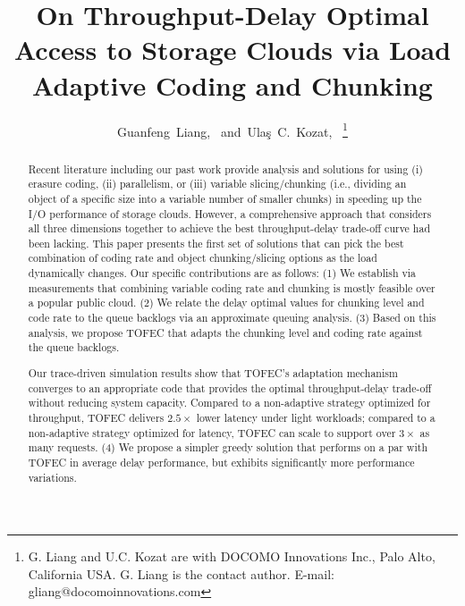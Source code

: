 \documentclass[journal]{IEEEtran}
\newcommand{\comment}[1]{}
\newcommand{\ourscheme}{TOFEC\xspace}
\begin{document}
\title{On Throughput-Delay Optimal Access to Storage Clouds via Load Adaptive Coding and Chunking}

\author{Guanfeng~Liang,~
        and~Ula\c{s}~C.~Kozat,~
\thanks{G. Liang and U.C. Kozat are with DOCOMO Innovations Inc., Palo Alto, California USA. G. Liang is the contact author. E-mail: gliang@docomoinnovations.com}
}
\maketitle

\begin{abstract}
Recent literature including our past work provide analysis and solutions for using (i) erasure coding, (ii) parallelism, or (iii) variable slicing/chunking (i.e., dividing an object of a specific size into a variable number of smaller chunks) in speeding up the I/O performance of storage clouds.  However, a comprehensive approach that considers all three dimensions together to achieve the best throughput-delay trade-off curve had been lacking.  This paper presents the first set of solutions that can pick the best combination of coding rate and object chunking/slicing options as the load dynamically changes. Our specific contributions are as follows: (1) We establish via measurements that combining variable coding rate and chunking is mostly feasible over a popular public cloud. (2) We relate the delay optimal values for chunking level and code rate to the queue backlogs via an approximate queuing analysis. (3) Based on this analysis, we propose \ourscheme that adapts the chunking level and coding rate against the queue backlogs. 
\comment{Under light workloads, \ourscheme creates  smaller chunks and uses more parallel connections per file, minimizing service delay. Under heavy workloads, \ourscheme automatically reduces the level of chunking (fewer chunks with increased size) and uses fewer parallel connections to reduce overhead, resulting in higher throughput and preventing queueing delay.} 
Our trace-driven simulation results show that \ourscheme's adaptation mechanism converges to an appropriate code that provides the optimal throughput-delay trade-off without reducing system capacity. Compared to a non-adaptive strategy optimized for throughput, \ourscheme delivers $2.5\times$ lower latency under light workloads; compared to a non-adaptive strategy optimized for latency, \ourscheme can scale to support over $3\times$ as many requests. (4) We propose a simpler greedy solution that \comment{does not require the modeling of the delay distribution. The greedy solution} 
performs on a par with \ourscheme in average delay performance, but exhibits significantly more performance variations.   
\comment{
}


\end{abstract}
\end{document}
